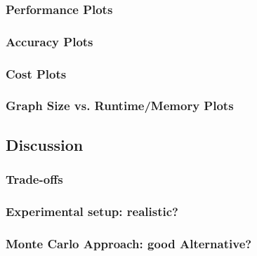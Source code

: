 \subsubsection{Performance Plots}
\subsubsection{Accuracy Plots}
\subsubsection{Cost Plots}
\subsubsection{Graph Size vs. Runtime/Memory Plots}

\subsection{Discussion}
\subsubsection{Trade-offs}
\subsubsection{Experimental setup: realistic?}
\subsubsection{Monte Carlo Approach: good Alternative?}
